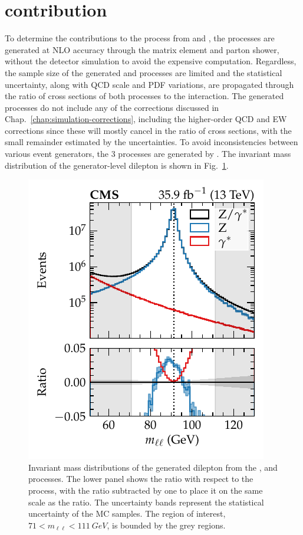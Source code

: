 \section{\Pgstar contribution}

To determine the contributions to the \IDYll process from \IZll and \Igstarll, the processes are generated at NLO accuracy through the matrix element and parton shower, without the detector simulation to avoid the expensive computation. Regardless, the sample size of the generated \IZll and \Igstarll processes are limited and the statistical uncertainty, along with QCD scale and PDF variations, are propagated through the ratio of cross sections of both processes to the \IDYll interaction. The generated processes do not include any of the corrections discussed in Chap.~\ref{chap:simulation-corrections}, including the higher-order QCD and EW corrections since these will mostly cancel in the ratio of cross sections, with the small remainder estimated by the uncertainties. To avoid inconsistencies between various event generators, the 3 processes are generated by \MADGRAPH. The invariant mass distribution of the generator-level dilepton is shown in Fig.~\ref{fig:gstar_invmass}.
%
\begin{figure}
    \centering
    \includegraphics{chapters/042_backgrounds/images/gstar_invmass.pdf}
    \caption[Invariant mass distributions of the \IDYll, \IZll and \Igstarll processes.]{
        Invariant mass distributions of the generated dilepton from the \IDYll, \IZll and \Igstarll processes. The lower panel shows the ratio with respect to the \IDYll process, with the \IZll ratio subtracted by one to place it on the same scale as the \Igstar ratio. The uncertainty bands represent the statistical uncertainty of the MC samples. The region of interest, ${71<m_{\ell\ell}<\SI{111}{GeV}}$, is bounded by the grey regions.
    }
    \label{fig:gstar_invmass}
\end{figure}
